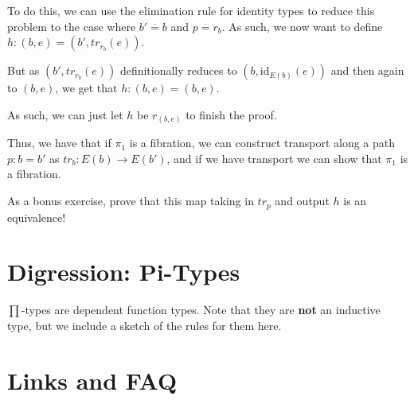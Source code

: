 \documentclass{amsart}
\theoremstyle{definition}
\newcommand{\type}{\ensuremath{\mathsf{~type}}}
\newcommand{\defeq}{\ensuremath{\overset{\boldsymbol{\cdot}}{=}}}
\begin{document}
To do this, we can use the elimination rule for identity types to reduce this problem to the case where $b' \defeq b$ and $p \defeq r_b$. As such, we now want to define $h : (b, e) = (b', tr_{r_b} (e))$.

But as $(b', tr_{r_b} (e))$ definitionally reduces to $(b, \text{id}_{E(b)} (e))$ and then again to $(b, e)$, we get that $h : (b, e) = (b, e)$.

As such, we can just let $h$ be $r_{(b, e)}$ to finish the proof.

Thus, we have that if $\pi_1$ is a fibration, we can construct transport along a path $p : b = b'$ as $tr_b : E(b) \to E(b')$, and if we have transport we can show that $\pi_1$ is a fibration.

As a bonus exercise, prove that this map taking in $tr_p$ and output $h$ is an equivalence!

\section{Digression: Pi-Types}
$\prod$-types are dependent function types. 
Note that they are \textbf{not} an inductive type, but we include a sketch of the rules for them here.


\section{Links and FAQ}
\end{document}
